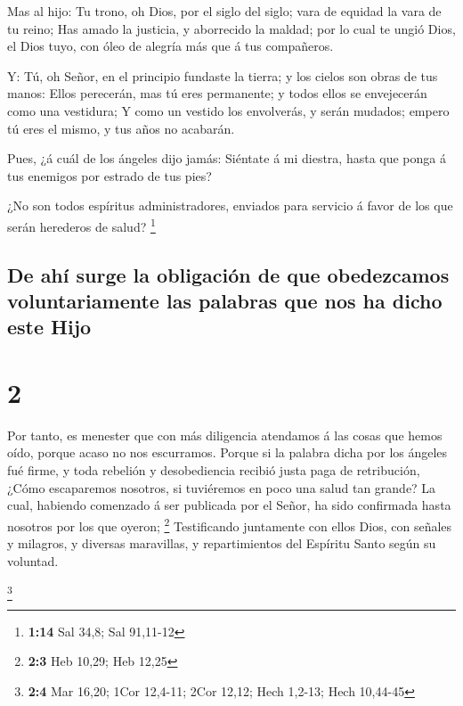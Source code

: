  Mas al hijo: Tu trono, oh Dios, por el siglo del siglo;
vara de equidad la vara de tu reino;  Has amado la
justicia, y aborrecido la maldad; por lo cual te ungió Dios, el Dios
tuyo, con óleo de alegría más que á tus compañeros.

 Y: Tú, oh Señor, en el principio fundaste la tierra; y
los cielos son obras de tus manos:  Ellos perecerán, mas
tú eres permanente; y todos ellos se envejecerán como una vestidura;
 Y como un vestido los envolverás, y serán mudados;
empero tú eres el mismo, y tus años no acabarán.

 Pues, ¿á cuál de los ángeles dijo jamás: Siéntate á mi
diestra, hasta que ponga á tus enemigos por estrado de tus pies?

 ¿No son todos espíritus administradores, enviados para
servicio á favor de los que serán herederos de salud? \footnote{\textbf{1:14}
  Sal 34,8; Sal 91,11-12}

\hypertarget{de-ahuxed-surge-la-obligaciuxf3n-de-que-obedezcamos-voluntariamente-las-palabras-que-nos-ha-dicho-este-hijo}{%
\subsection{De ahí surge la obligación de que obedezcamos
voluntariamente las palabras que nos ha dicho este
Hijo}\label{de-ahuxed-surge-la-obligaciuxf3n-de-que-obedezcamos-voluntariamente-las-palabras-que-nos-ha-dicho-este-hijo}}

\hypertarget{section-1}{%
\section{2}\label{section-1}}

 Por tanto, es menester que con más diligencia atendamos á
las cosas que hemos oído, porque acaso no nos escurramos. 
Porque si la palabra dicha por los ángeles fué firme, y toda rebelión y
desobediencia recibió justa paga de retribución,  ¿Cómo
escaparemos nosotros, si tuviéremos en poco una salud tan grande? La
cual, habiendo comenzado á ser publicada por el Señor, ha sido
confirmada hasta nosotros por los que oyeron; \footnote{\textbf{2:3} Heb
  10,29; Heb 12,25}  Testificando juntamente con ellos
Dios, con señales y milagros, y diversas maravillas, y repartimientos
del Espíritu Santo según su voluntad.

\footnote{\textbf{2:4} Mar 16,20; 1Cor 12,4-11; 2Cor 12,12; Hech 1,2-13;
  Hech 10,44-45}

